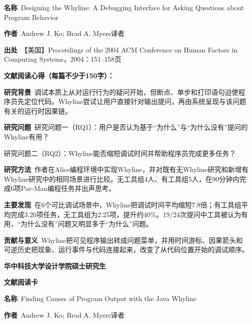 \vspace{0.35em}
\noindent\textbf{名称}\ Designing the Whyline: A Debugging Interface for Asking Questions about Program Behavior\par
\noindent\textbf{作者}\ Andrew J. Ko; Brad A. Myers\quad 译者\par
\noindent\textbf{出处}\ 【美国】Proceedings of the 2004 ACM Conference on Human Factors in Computing Systems，2004：151–158\quad 页\par
\vspace{0.35em}
\noindent\textbf{文献阅读心得（每篇不少于150字）：}\par
\noindent\textbf{研究背景}\ 调试本质上从对运行行为的疑问开始，但断点、单步和打印语句迫使程序员先定位代码。Whyline尝试让用户直接针对输出提问，再由系统呈现与该问题有关的运行时因果链。\par
\noindent\textbf{研究问题}\ 研究问题一（RQ1）：用户是否认为基于“为什么”与“为什么没有”提问的Whyline有用？\par
研究问题二（RQ2）：Whyline能否缩短调试时间并帮助程序员完成更多任务？\par
\noindent\textbf{研究方法}\ 作者在Alice编程环境中实现Whyline，并对既有无Whyline研究和新增有Whyline研究中的相同场景进行比较。无工具组4人、有工具组5人，在90分钟内完成6项Pac-Man编程任务并出声思考。\par
\noindent\textbf{主要发现}\ 在6个可比调试场景中，Whyline把调试时间平均缩短7.8倍；有工具组平均完成3.20项任务，无工具组为2.25项，提升约40\%。19/24次提问中工具被认为有用，“为什么没有”问题又明显多于“为什么”问题。\par
\noindent\textbf{贡献与意义}\ Whyline把可见程序输出转成问题菜单，并用时间游标、因果箭头和可逆历史把现象、运行事件与代码连接起来，改变了从代码位置开始的调试顺序。\par
\clearpage
\begin{center}
{\songti\bfseries\fontsize{18.5pt}{27.75pt}\selectfont 华中科技大学设计学院硕士研究生\par}
{\songti\bfseries\fontsize{18.5pt}{27.75pt}\selectfont 文献阅读卡\par}
\end{center}
\vspace{0.25em}
\noindent\underline{}\par
\vspace{0.35em}
\noindent\textbf{名称}\ Finding Causes of Program Output with the Java Whyline\par
\noindent\textbf{作者}\ Andrew J. Ko; Brad A. Myers\quad 译者\par
